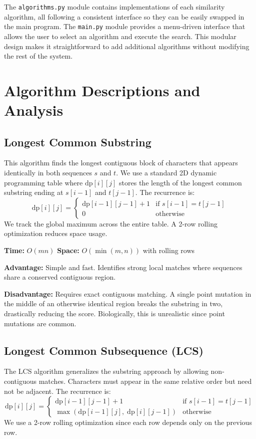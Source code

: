 \documentclass{article}
\begin{document}
The \texttt{algorithms.py} module contains implementations of each similarity algorithm, all following a consistent interface so they can be easily swapped in the main program. The \texttt{main.py} module provides a menu-driven interface that allows the user to select an algorithm and execute the search. This modular design makes it straightforward to add additional algorithms without modifying the rest of the system.

\section{Algorithm Descriptions and Analysis}

\subsection{Longest Common Substring}

This algorithm finds the longest contiguous block of characters that appears identically in both sequences $s$ and $t$. We use a standard 2D dynamic programming table where $\text{dp}[i][j]$ stores the length of the longest common substring ending at $s[i{-}1]$ and $t[j{-}1]$. The recurrence is:
\[
\text{dp}[i][j] = 
\begin{cases}
\text{dp}[i{-}1][j{-}1] + 1 & \text{if } s[i{-}1] = t[j{-}1] \\
0 & \text{otherwise}
\end{cases}
\]
We track the global maximum across the entire table. A 2-row rolling optimization reduces space usage.

\textbf{Time:} $O(mn)$ \quad \textbf{Space:} $O(\min(m, n))$ with rolling rows

\textbf{Advantage:} Simple and fast. Identifies strong local matches where sequences share a conserved contiguous region.

\textbf{Disadvantage:} Requires exact contiguous matching. A single point mutation in the middle of an otherwise identical region breaks the substring in two, drastically reducing the score. Biologically, this is unrealistic since point mutations are common.

\subsection{Longest Common Subsequence (LCS)}

The LCS algorithm generalizes the substring approach by allowing non-contiguous matches. Characters must appear in the same relative order but need not be adjacent. The recurrence is:
\[
\text{dp}[i][j] = 
\begin{cases}
\text{dp}[i{-}1][j{-}1] + 1 & \text{if } s[i{-}1] = t[j{-}1] \\
\max(\text{dp}[i{-}1][j],\; \text{dp}[i][j{-}1]) & \text{otherwise}
\end{cases}
\]
We use a 2-row rolling optimization since each row depends only on the previous row.
\end{document}
